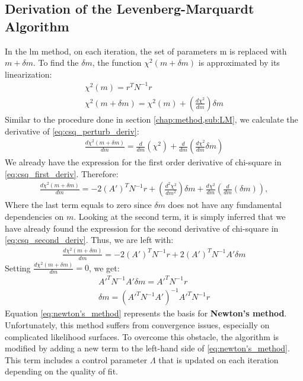 \documentclass[12pt, TexShade, letterpaper]{report}
\begin{document}
\subsection{Derivation of the Levenberg-Marquardt Algorithm}
In the \gls{lm} method, on each iteration, the set of parameters m is replaced with $m+\delta m$. To find the $\delta m$, the function $\chi^2 (m +\delta m)$ is approximated by its linearization: 
\begin{gather}
    \chi^2 \left(m\right) = r^T N^{-1} r\\
    \chi^2 \left(m + \delta m\right) =  \chi^2 \left(m\right) + \left(\frac{d \chi^2}{dm}\right) \delta m \label{eq:csq_perturb_deriv}
\end{gather}
Similar to the procedure done in section \ref{chap:method,sub:LM}, we calculate the derivative of \ref{eq:csq_perturb_deriv}:
\begin{gather}
    \frac{d \chi^2 \left(m +\delta m\right)}{dm} = \frac{d}{dm} \left(\chi^2\right) + \frac{d}{dm} \left(\frac{d\chi^2}{dm} \delta m\right)
\end{gather}
We already have the expression for the first order derivative of chi-square in \ref{eq:csq_first_deriv}. Therefore:
\begin{gather}
   \frac{d \chi^2 \left(m +\delta m\right)}{dm} =  -2 \left(A'\right)^T N^{-1} r + \left(\frac{d^2 \chi^2}{dm^2}\right) \delta m + \frac{d\chi^2}{dm} \left(\frac{d}{dm} (\delta m)\right),
\end{gather}
Where the last term equals to zero since $\delta m$ does not have any fundamental dependencies on $m$. Looking at the second term, it is simply inferred that we have already found the expression for the second derivative of chi-square in \ref{eq:csq_second_deriv}. Thus, we are left with:
\begin{gather}
    \frac{d \chi^2 (m +\delta m)}{dm} =  -2 \left(A'\right)^T N^{-1} r + 2 \left(A'\right)^T N^{-1} A'\delta m
\end{gather}
Setting $\frac{d \chi^2 (m +\delta m)}{dm} = 0$, we get:
\begin{gather}
    A'^{T} N^{-1}A' \delta m = A'^T N^{-1} r \\
    \delta m = \left(A'^{T} N^{-1}A'\right)^{-1} A'^T N^{-1} r \label{eq:newton's_method}   
\end{gather}
Equation \ref{eq:newton's_method} represents the basis for \textbf{Newton's method}. Unfortunately, this method suffers from convergence issues, especially on complicated likelihood surfaces. To overcome this obstacle, the algorithm is modified by adding a new term to the left-hand side of \ref{eq:newton's_method}. This term includes a control parameter $\Lambda$ that is updated on each iteration depending on the quality of fit. 
\end{document}

